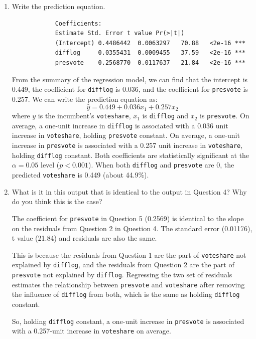 \documentclass[12pt,letterpaper]{article}
\begin{document}
\begin{enumerate}
\begin{footnotesize}
\begin{verbatim}
Residual standard error: 0.07339 on 3190 degrees of freedom
Multiple R-squared:  0.4496,	Adjusted R-squared:  0.4493 
F-statistic:  1303 on 2 and 3190 DF,  p-value: < 2.2e-16
	\end{verbatim}
\end{footnotesize}
		\newpage
		\item Write the prediction equation.
		\begin{doublespace}
		\begin{footnotesize}
		\begin{verbatim}
			Coefficients:
			Estimate Std. Error t value Pr(>|t|)    
			(Intercept) 0.4486442  0.0063297   70.88   <2e-16 ***
			difflog     0.0355431  0.0009455   37.59   <2e-16 ***
			presvote    0.2568770  0.0117637   21.84   <2e-16 ***
		\end{verbatim}
		\end{footnotesize}
	From the summary of the regression model, we can find that the intercept is 0.449, the coefficient for \texttt{difflog} is 0.036, and the coefficient for \texttt{presvote} is 0.257. We can write the prediction equation as:
	$$\hat{y} = 0.449 + 0.036x_1 + 0.257x_2$$
	where $y$ is the incumbent's \texttt{voteshare}, $x_1$ is \texttt{difflog} and $x_2$ is \texttt{presvote}. On average, a one-unit increase in \texttt{difflog} is associated with a 0.036 unit increase in \texttt{voteshare}, holding \texttt{presvote} constant. On average, a one-unit increase in \texttt{presvote} is associated with a 0.257 unit increase in \texttt{voteshare}, holding \texttt{difflog} constant. Both coefficients are statistically significant at the $\alpha = 0.05$ level ($p < 0.001$). When both \texttt{difflog} and \texttt{presvote} are 0, the predicted \texttt{voteshare} is 0.449 (about 44.9\%).
	\end{doublespace}
		\newpage
		\item What is it in this output that is identical to the output in Question 4? Why do you think this is the case? \\
		\begin{doublespace}
			The coefficient for \texttt{presvote} in Question 5 (0.2569) is identical to the slope on the residuals from Question 2 in Question 4. The standard error (0.01176), t value (21.84) and residuals are also the same.

			This is because the residuals from Question 1 are the part of \texttt{voteshare} not explained by \texttt{difflog}, and the residuals from Question 2 are the part of \texttt{presvote} not explained by \texttt{difflog}. Regressing the two set of residuals estimates the relationship between \texttt{presvote} and \texttt{voteshare} after removing the influence of \texttt{difflog} from both, which is the same as holding \texttt{difflog} constant.

			So, holding \texttt{difflog} constant, a one-unit increase in \texttt{presvote} is associated with a 0.257-unit increase in \texttt{voteshare} on average.
			
		\end{doublespace}
	\end{enumerate}
\end{document}
